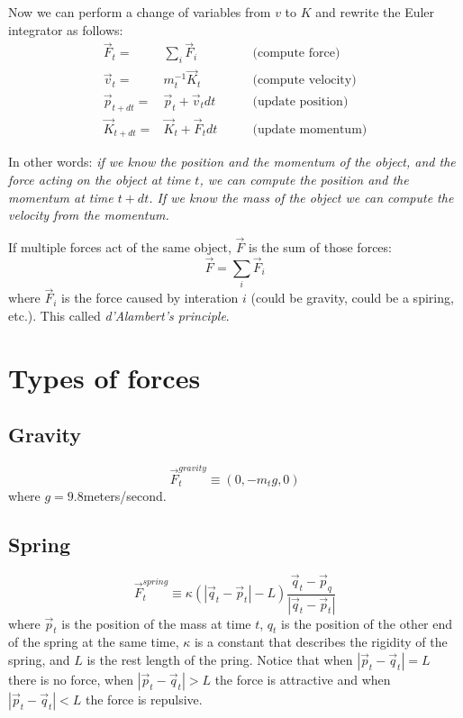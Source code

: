 \documentclass[12pt]{article}
\begin{document}
Now we can perform a change of variables from $v$ to $K$ and rewrite the Euler integrator as follows:
\begin{eqnarray}
\vec F_t =& \sum_i \vec F_i &\qquad \textrm{(compute force)}\\
\vec v_{t} =& m_t^{-1}\vec K_{t} &\qquad \textrm{(compute velocity)}\\
\vec p_{t+dt} =& \vec p_t + \vec v_t dt &\qquad \textrm{(update position)}\\
\vec K_{t+dt} =& \vec K_t + \vec F_t dt &\qquad \textrm{(update momentum)}\label{euler21}
\end{eqnarray}

In other words: {\it if we know the position and the momentum of the object, and the force acting on the object at time $t$, we can compute the position and the momentum at time $t+dt$. If we know the mass of the object we can compute the velocity from the momentum.}

If multiple forces act of the same object, $\vec F$ is the sum of those forces:
\begin{equation}
\vec F = \sum_i \vec F_i
\end{equation}
where $\vec F_i$ is the force caused by interation $i$ (could be gravity, could be a spiring, etc.). This called {\it d'Alambert's principle}.

\section{Types of forces}

\subsection{Gravity}

\begin{equation}
\vec F_t^{gravity} \equiv (0, -m_t g, 0) 
\end{equation}
where $g = 9.8$meters/second.

\subsection{Spring}

\begin{equation}
  \vec F_t^{spring} \equiv \kappa (|\vec q_t - \vec p_t|-L) \frac{\vec q_t-\vec p_q}{|\vec q_t-\vec p_t|}
\end{equation}
where $\vec p_t$ is the position of the mass at time $t$, $q_t$ is the position of the other end of the spring at the same time, $\kappa$ is a constant that describes the rigidity of the spring, and $L$ is the rest length of the pring. Notice that when $|\vec p_t - \vec q_t|=L$ there is no force, when $|\vec p_t - \vec q_t|>L$ the force is attractive and when $|\vec p_t - \vec q_t|<L$ the force is repulsive. 
\end{document}
